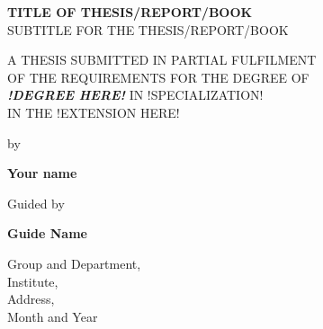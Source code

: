 \thispagestyle{empty} 

\begin{center}


	\begin{Large}

	\uppercase{\textbf{Title of Thesis/Report/Book}
	\vspace{0.5cm}
	\\Subtitle for the Thesis/Report/Book}
	
	\end{Large}
			
	\vspace{1.5cm}
			
	\uppercase{A Thesis submitted in partial fulfilment \\ 
	of the requirements for the Degree of\\
	\textit{\textbf{!Degree here!}} in !Specialization!
	\\ in the !extension here!}
			
			
	\vfill
	by
			
	\textbf{Your name}
			
	Guided by
			
	\textbf{Guide Name}
			
	\vspace{0.8cm}
			
			
	Group and Department,\\
	Institute,\\
	Address,\\
	Month and Year
			
\end{center}